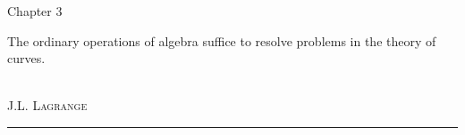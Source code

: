 \begin{titlepage}
\noindent
\titlefont Chapter 3\par
\epigraph{The ordinary operations of algebra suffice to resolve problems in the theory of curves.}%
{\textit{}\\ \textsc{J.L. Lagrange}}
\null\vfill
\vspace*{1cm}
\noindent
\hfill
\begin{minipage}{0.35\linewidth}
    \begin{flushright}
        \printauthor
    \end{flushright}
\end{minipage}
%
\begin{minipage}{0.02\linewidth}
    \rule{1pt}{60pt}
\end{minipage}
\titlepagedecoration

\end{titlepage}
